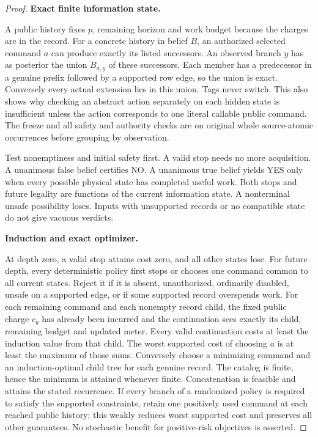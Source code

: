 \begin{proof}

\textbf{Exact finite information state.}

A public history fixes \(p\), remaining horizon and work budget because the charges are in the record. For a concrete history in belief \(B\), an authorized selected command \(a\) can produce exactly its listed successors. An observed branch \(y\) has as posterior the union \(B_{a,y}\) of these successors. Each member has a predecessor in a genuine prefix followed by a supported row edge, so the union is exact. Conversely every actual extension lies in this union. Tags never switch. This also shows why checking an abstract action separately on each hidden state is insufficient unless the action corresponds to one literal callable public command. The freeze and all safety and authority checks are on original whole source-atomic occurrences before grouping by observation.

Test nonemptiness and initial safety first. A valid stop needs no more acquisition. A unanimous false belief certifies NO. A unanimous true belief yields YES only when every possible physical state has completed useful work. Both stops and future legality are functions of the current information state. A nonterminal unsafe possibility loses. Inputs with unsupported records or no compatible state do not give vacuous verdicts.

\textbf{Induction and exact optimizer.}

At depth zero, a valid stop attains cost zero, and all other states lose. For future depth, every deterministic policy first stops or chooses one command common to all current states. Reject it if it is absent, unauthorized, ordinarily disabled, unsafe on a supported edge, or if some supported record overspends work. For each remaining command and each nonempty record child, the fixed public charge \(c_y\) has already been incurred and the continuation sees exactly its child, remaining budget and updated meter. Every valid continuation costs at least the induction value from that child. The worst supported cost of choosing \(a\) is at least the maximum of those sums. Conversely choose a minimizing command and an induction-optimal child tree for each genuine record. The catalog is finite, hence the minimum is attained whenever finite. Concatenation is feasible and attains the stated recurrence. If every branch of a randomized policy is required to satisfy the supported constraints, retain one positively used command at each reached public history; this weakly reduces worst supported cost and preserves all other guarantees. No stochastic benefit for positive-risk objectives is asserted.


\end{proof}
